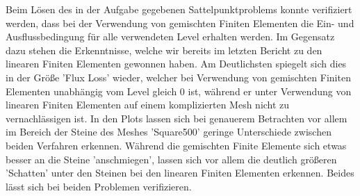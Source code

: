\begin{figure}[H]
	\centering

\end{figure}

Beim Lösen des in der Aufgabe gegebenen Sattelpunktproblems konnte verifiziert werden, dass bei der Verwendung von gemischten Finiten Elementen die Ein- und Ausflussbedingung für alle verwendeten Level erhalten werden.
Im Gegensatz dazu stehen die Erkenntnisse, welche wir bereits im letzten Bericht zu den linearen Finiten Elementen gewonnen haben. 
Am Deutlichsten spiegelt sich dies in der Größe 'Flux Loss' wieder, welcher bei Verwendung von gemischten Finiten Elementen unabhängig vom Level gleich 0 ist, während er unter Verwendung von linearen Finiten Elementen auf einem komplizierten Mesh nicht zu vernachlässigen ist.  \newline
In den Plots lassen sich bei genauerem Betrachten vor allem im Bereich der Steine des Meshes 'Square500' geringe Unterschiede zwischen beiden Verfahren erkennen. Während die gemischten Finite Elemente sich etwas besser an die Steine 'anschmiegen', lassen sich vor allem die deutlich größeren 'Schatten' unter den Steinen bei den linearen Finiten Elementen erkennen.
Beides lässt sich bei beiden Problemen verifizieren. 


